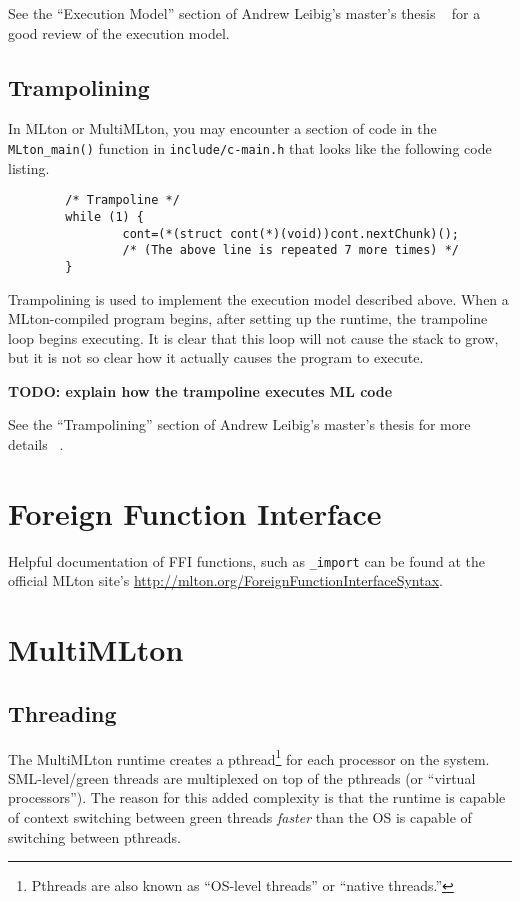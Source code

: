 \documentclass{article}
\begin{document}
See the ``Execution Model'' section of Andrew Leibig's master's thesis
~\cite{Leibig13} for a good review of the execution model.

\subsection{Trampolining}

In MLton or MultiMLton, you may encounter a section of code in the
\texttt{MLton\_main()} function in \texttt{include/c-main.h} that looks
like the following code listing.

\lstset{language=C}
\begin{lstlisting}
        /* Trampoline */
        while (1) {
                cont=(*(struct cont(*)(void))cont.nextChunk)();
                /* (The above line is repeated 7 more times) */
        }      
\end{lstlisting}

Trampolining is used to implement the execution model described
above.  When a MLton-compiled program begins, after setting up the
runtime, the trampoline loop begins executing.  It is clear that this
loop will not cause the stack to grow, but it is not so clear how it
actually causes the program to execute.

\textbf{TODO: explain how the trampoline executes ML code}

See the ``Trampolining'' section of Andrew Leibig's master's thesis for more details ~\cite{Leibig13}.

\section{Foreign Function Interface}

Helpful documentation of FFI functions, such as \texttt{\_import} can
be found at the official MLton site's
\href{ForeignFunctionInterfaceSyntax page}{http://mlton.org/ForeignFunctionInterfaceSyntax}.

\section{MultiMLton}
\subsection{Threading}

The MultiMLton runtime creates a pthread\footnote{Pthreads are also
  known as ``OS-level threads'' or ``native threads.''} for each
processor on the system.  SML-level/green threads are multiplexed on
top of the pthreads (or ``virtual processors''). The reason for this
added complexity is that the runtime is capable of context switching
between green threads \textit{faster} than the OS is capable of
switching between pthreads.
\end{document}
